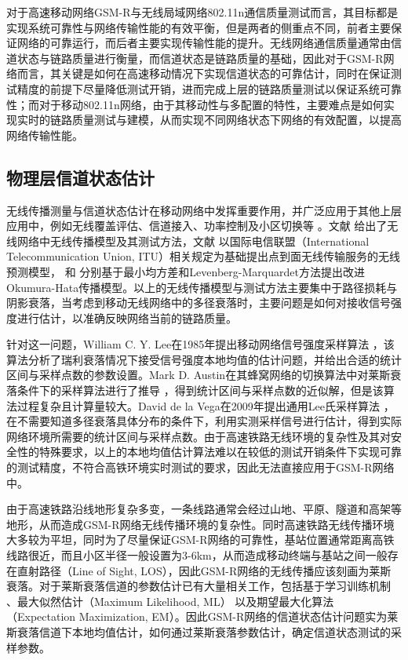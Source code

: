 对于高速移动网络GSM-R与无线局域网络802.11n通信质量测试而言，其目标都是实现系统可靠性与网络传输性能的有效平衡，但是两者的侧重点不同，前者主要保证网络的可靠运行，而后者主要实现传输性能的提升。无线网络通信质量通常由信道状态与链路质量进行衡量，而信道状态是链路质量的基础，因此对于GSM-R网络而言，其关键是如何在高速移动情况下实现信道状态的可靠估计，同时在保证测试精度的前提下尽量降低测试开销，进而完成上层的链路质量测试以保证系统可靠性；而对于移动802.11n网络，由于其移动性与多配置的特性，主要难点是如何实现实时的链路质量测试与建模，从而实现不同网络状态下网络的有效配置，以提高网络传输性能。

\subsection{物理层信道状态估计}
\label{sec:phy}

无线传播测量与信道状态估计在移动网络中发挥重要作用，并广泛应用于其他上层应用中，例如无线覆盖评估、信道接入、功率控制及小区切换等 \cite{Austin1994}\cite{itoh2002performance}\cite{zhang1996analysis}\cite{zhu2005performance}。文献 \cite{andersen1995propagation} \cite{sarkar2003survey} 给出了无线网络中无线传播模型及其测试方法，文献 \cite{Ostlin2008itu} 以国际电信联盟（International Telecommunication Union, ITU）相关规定为基础提出点到面无线传输服务的无线预测模型，\cite{Akhoondzadeh2007modifi} 和 \cite{medeisis2000use} 分别基于最小均方差和Levenberg-Marquardet方法提出改进Okumura-Hata传播模型。以上的无线传播模型与测试方法主要集中于路径损耗与阴影衰落，当考虑到移动无线网络中的多径衰落时，主要问题是如何对接收信号强度进行估计，以准确反映网络当前的链路质量。

针对这一问题，William C. Y. Lee在1985年提出移动网络信号强度采样算法 \cite{lee1985estimate}，该算法分析了瑞利衰落情况下接受信号强度本地均值的估计问题，并给出合适的统计区间与采样点数的参数设置。Mark D. Austin在其蜂窝网络的切换算法中对莱斯衰落条件下的采样算法进行了推导 \cite{Austin1994}，得到统计区间与采样点数的近似解，但是该算法过程复杂且计算量较大。David de la Vega在2009年提出通用Lee氏采样算法 \cite{Vega2009}，在不需要知道多径衰落具体分布的条件下，利用实测采样信号进行估计，得到实际网络环境所需要的统计区间与采样点数。由于高速铁路无线环境的复杂性及其对安全性的特殊要求，以上的本地均值估计算法难以在较低的测试开销条件下实现可靠的测试精度，不符合高铁环境实时测试的要求，因此无法直接应用于GSM-R网络中。

由于高速铁路沿线地形复杂多变，一条线路通常会经过山地、平原、隧道和高架等地形，从而造成GSM-R网络无线传播环境的复杂性。同时高速铁路无线传播环境大多较为平坦，同时为了尽量保证GSM-R网络的可靠性，基站位置通常距离高铁线路很近，而且小区半径一般设置为3-6km，从而造成移动终端与基站之间一般存在直射路径（Line of Sight, LOS），因此GSM-R网络的无线传播应该刻画为莱斯衰落。对于莱斯衰落信道的参数估计已有大量相关工作，包括基于学习训练机制 \cite{bjornson2010framework}、最大似然估计（Maximum Likelihood, ML） \cite{sijbers1998maximum} 以及期望最大化算法（Expectation Maximization, EM）\cite{marzetta1995algorithm}。因此GSM-R网络的信道状态估计问题实为莱斯衰落信道下本地均值估计，如何通过莱斯衰落参数估计，确定信道状态测试的采样参数。

